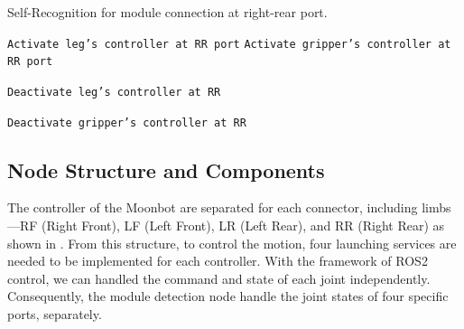 \begin{algorithm}[h]
\caption{Self-Recognition for module connection at right-rear port.}
\label{alg:module_recognition}
\begin{algorithmic}[1]
    
            \State \texttt{Activate leg's controller at RR port}
            \State \texttt{Activate gripper's controller at RR port}
        \EndIf
        
                \State \texttt{Deactivate leg's controller at RR}
            \EndIf
            
                \State \texttt{Deactivate gripper's controller at RR}
            \EndIf
        \EndIf
    \EndIf
\EndFunction
\end{algorithmic}
\end{algorithm}

\subsection{Node Structure and Components}
The controller of the Moonbot are separated for each connector, including limbs—RF (Right Front), LF (Left Front), LR (Left Rear), and RR (Right Rear) as shown in . From this structure, to control the motion, four launching services are needed to be implemented for each controller. With the framework of ROS2 control, we can handled the command and state of each joint independently. Consequently, the module detection node handle the joint states of four specific ports, separately. \\

